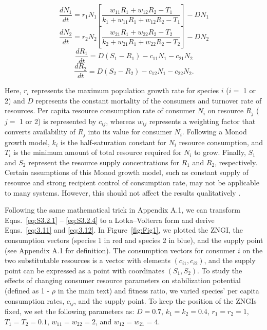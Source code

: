\begin{equation}
\frac{{d{N_1}}}{{dt}} = {r_1}{N_1}\left[ {\frac{{{w_{11}}{R_1} + {w_{12}}{R_2} - {T_1}}}{{{k_1} + {w_{11}}{R_1} + {w_{12}}{R_2} - {T_1}}}} \right] - D{N_1}
\tag{S3.2.1}\label{eq:S3.2.1}
\end{equation}
\begin{equation}
\frac{{d{N_2}}}{{dt}} = {r_2}{N_2}\left[ {\frac{{{w_{21}}{R_1} + {w_{22}}{R_2} - {T_2}}}{{{k_2} + {w_{21}}{R_1} + {w_{22}}{R_2} - {T_2}}}} \right] - D{N_2}
\tag{S3.2.2}\label{eq:S3.2.2}
\end{equation}
\begin{equation}
\frac{{d{R_1}}}{{dt}} = D\left( {{S_1} - {R_1}} \right) - {c_{11}}{N_1} - {c_{21}}{N_2}
\tag{S3.2.3}\label{eq:S3.2.3}
\end{equation}
\begin{equation}
\frac{{d{R_2}}}{{dt}} = D\left( {{S_2} - {R_2}} \right) - {c_{12}}{N_1} - {c_{22}}{N_2}.
\tag{S3.2.4}\label{eq:S3.2.4}
\end{equation}

\noindent Here, $r_{i}$ represents the maximum population growth rate for species $i$ ($i = $ 1 or 2) and $D$ represents the constant mortality of the consumers and turnover rate of resources. Per capita resource consumption rate of consumer $N_{i}$ on resource $R_{j}$ ($j = $ 1 or 2) is represented by $c_{ij}$, whereas $w_{ij}$ represents a weighting factor that converts availability of $R_{j}$ into its value for consumer $N_{i}$. Following a Monod growth model, $k_{i}$ is the half-saturation constant for $N_{i}$ resource consumption, and $T_{i}$ is the minimum amount of total resource required for $N_{i}$ to grow. Finally, $S_{1}$ and $S_{2}$ represent the resource supply concentrations for $R_{1}$ and $R_{2}$, respectively. Certain assumptions of this Monod growth model, such as constant supply of resource and strong recipient control of consumption rate, may not be applicable to many systems. However, this should not affect the results qualitatively \cite{Kleinhesselink2015}. 
\par


Following the same mathematical trick in Appendix A.1, we can transform Eqns.~\ref{eq:S3.2.1} -- \ref{eq:S3.2.4} to a Lotka--Volterra form and derive Eqns.~\ref{eq:3.11} and \ref{eq:3.12}. In Figure~\ref{fig:Fig1}, we plotted the ZNGI, the consumption vectors (species 1 in red and species 2 in blue), and the supply point (see Appendix A.1 for definition). The consumption vectors for consumer $i$ on the two substitutable resources is a vector with elements $\left( c_{i1}, c_{i2} \right)$, and the supply point can be expressed as a point with coordinates $\left( S_{1}, S_{2} \right)$. To study the effects of changing consumer resource parameters on stabilization potential (defined as 1 - $\rho$ in the main text) and fitness ratio, we varied species' per capita consumption rates, $c_{ij}$, and the supply point. To keep the position of the ZNGIs fixed, we set the following parameters as: $D = 0.7$, $k_{1} = k_{2} = 0.4$, $r_{1} = r_{2} = 1$, $T_{1} = T_{2} = 0.1$, $w_{11} = w_{22} = 2$, and $w_{12} = w_{21} = 4$. 
\par


